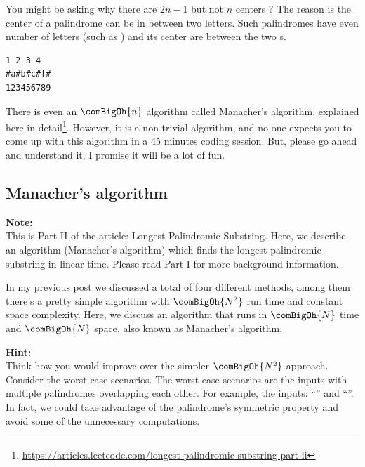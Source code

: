 You might be asking why there are $2n-1$ but not $n$ centers ? The reason
is the center of a palindrome can be in between two letters. Such
palindromes have even number of letters (such as )
and its center are between the two s.
\begin{lstlisting}[style=raygeneric]
 1 2 3 4
#a#b#c#f#
123456789
\end{lstlisting}




There is even an $\comBigOh{n}$ algorithm called Manacher's algorithm,
explained here in
detail\footnote{\url{https://articles.leetcode.com/longest-palindromic-substring-part-ii}}.
However, it is a non-trivial algorithm, and no one expects you to come up
with this algorithm in a 45 minutes coding session. But, please go ahead and
understand it, I promise it will be a lot of fun.


\subsection{Manacher's algorithm}

\noindent{}\textbf{Note:}\\
This is Part II of the article: Longest Palindromic Substring. Here, we
describe an algorithm (Manacher's algorithm) which finds the longest
palindromic substring in linear time. Please read Part I for more background
information.

In my previous post we discussed a total of four different methods, among
them there's a pretty simple algorithm with $\comBigOh{N^2}$ run time and
constant space complexity. Here, we discuss an algorithm that runs in
$\comBigOh{N}$ time and $\comBigOh{N}$ space, also known as Manacher's
algorithm.

\noindent{}\textbf{Hint:}\\
Think how you would improve over the simpler $\comBigOh{N^2}$ approach.
Consider the worst case scenarios. The worst case scenarios are the inputs
with multiple palindromes overlapping each other. For example, the inputs:
``'' and ``''. In fact, we could take
advantage of the palindrome's symmetric property and avoid some of the
unnecessary computations.


